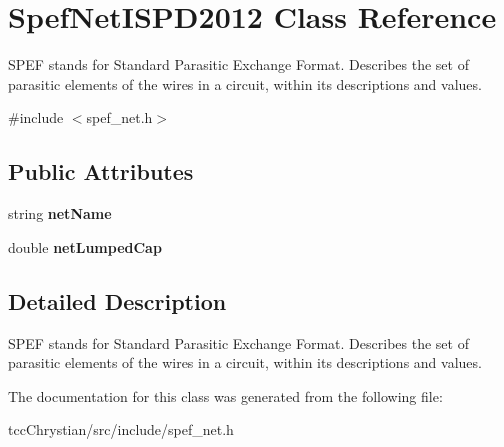 \hypertarget{classSpefNetISPD2012}{\section{Spef\-Net\-I\-S\-P\-D2012 Class Reference}
\label{classSpefNetISPD2012}
}


S\-P\-E\-F stands for Standard Parasitic Exchange Format. Describes the set of parasitic elements of the wires in a circuit, within its descriptions and values.  




{\ttfamily \#include $<$spef\-\_\-net.\-h$>$}

\subsection*{Public Attributes}
\begin{DoxyCompactItemize}
\item 
\hypertarget{classSpefNetISPD2012_aed87a4b73a2ad09be841c9b8ab222ad5}{string {\bfseries net\-Name}}\label{classSpefNetISPD2012_aed87a4b73a2ad09be841c9b8ab222ad5}

\item 
\hypertarget{classSpefNetISPD2012_ae0a1b7a236104b7a6be70fc977fe20e7}{double {\bfseries net\-Lumped\-Cap}}\label{classSpefNetISPD2012_ae0a1b7a236104b7a6be70fc977fe20e7}

\end{DoxyCompactItemize}


\subsection{Detailed Description}
S\-P\-E\-F stands for Standard Parasitic Exchange Format. Describes the set of parasitic elements of the wires in a circuit, within its descriptions and values. 



The documentation for this class was generated from the following file\-:\begin{DoxyCompactItemize}
\item 
tcc\-Chrystian/src/include/spef\-\_\-net.\-h\end{DoxyCompactItemize}
